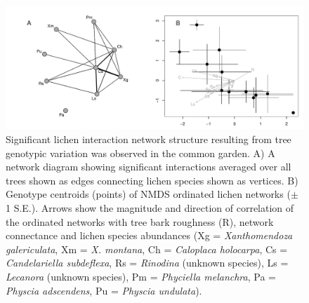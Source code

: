 \documentclass[9pt,twocolumn,twoside,lineno]{pnas-new}
\begin{document}
{\begin{figure}[ht]
\centering
\includegraphics[width=\linewidth]{cn_chplot_onc.pdf}
\caption{Significant lichen interaction network structure resulting
  from tree genotypic variation was observed in the common garden. A)
  A network diagram showing significant interactions averaged over all
  trees shown as edges connecting lichen species shown as vertices. B)
  Genotype centroids (points) of NMDS ordinated lichen networks ($\pm$
  1 S.E.). Arrows show the magnitude and direction of correlation of
  the ordinated networks with tree bark roughness (R), network
  connectance and lichen species abundances (Xg =
  \textit{Xanthomendoza galericulata}, Xm = \textit{X. montana}, Ch =
  \textit{Caloplaca holocarpa}, Cs = \textit{Candelariella
    subdeflexa}, Rs = \textit{Rinodina} (unknown species), Ls =
  \textit{Lecanora} (unknown species), Pm = \textit{Phyciella
    melanchra}, Pa = \textit{Physcia adscendens}, Pu = \textit{Physcia
    undulata}).}
\label{fig:ch_plot}
\end{figure}






}
\end{document}
